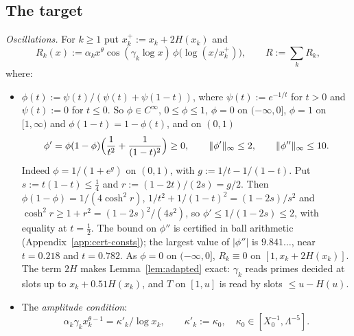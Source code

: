 \subsection{The target}\label{sec:target}
\emph{Oscillations.} For $k\ge1$ put $x_k^+:=x_k+2H(x_k)$ and
\begin{equation}\label{eq:Rk}
  R_k(x):=\alpha_kx^{\theta}\cos(\gamma_k\log x)\,\phi\bigl(\log(x/x_k^+)\bigr),\qquad R:=\sum_kR_k,
\end{equation}
where:
\begin{itemize}
\item $\phi(t):=\psi(t)/(\psi(t)+\psi(1-t))$, where $\psi(t):=e^{-1/t}$ for $t>0$ and $\psi(t):=0$ for $t\le0$. So $\phi\in C^\infty$,
$0\le\phi\le1$, $\phi=0$ on $(-\infty,0]$, $\phi=1$ on $[1,\infty)$ and $\phi(1-t)=1-\phi(t)$, and on $(0,1)$
\begin{equation}\label{eq:phibounds}
  \phi'=\phi(1-\phi)\Bigl(\frac1{t^2}+\frac1{(1-t)^2}\Bigr)\ge0,\qquad\|\phi'\|_\infty\le2,\qquad\|\phi''\|_\infty\le10 .
\end{equation}
Indeed $\phi=1/(1+e^g)$ on $(0,1)$, with $g:=1/t-1/(1-t)$. Put $s:=t(1-t)\le\frac14$ and $r:=(1-2t)/(2s)=g/2$. Then
$\phi(1-\phi)=1/(4\cosh^2r)$, $1/t^2+1/(1-t)^2=(1-2s)/s^2$ and $\cosh^2r\ge1+r^2=(1-2s)^2/(4s^2)$, so $\phi'\le1/(1-2s)\le2$, with
equality at $t=\frac12$. The bound on $\phi''$ is certified in ball arithmetic (Appendix~\ref{app:cert-consts}); the largest value of
$|\phi''|$ is $9.841\ldots$, near $t=0.218$ and $t=0.782$. As $\phi=0$ on $(-\infty,0]$, $R_k\equiv0$ on
$[1,x_k+2H(x_k)]$. The term $2H$ makes Lemma~\ref{lem:adapted} exact: $\gamma_k$ reads primes decided at slots up to
$x_k+0.51H(x_k)$, and $T$ on $[1,u]$ is read by slots $\le u-H(u)$.
\item The \emph{amplitude condition}:
\begin{equation}\label{eq:ampl}
  \alpha_k\gamma_kx_k^{\theta-1}=\kappa'_k/\log x_k,\qquad \kappa'_k:=\kappa_0,\quad \kappa_0\in[X_0^{-1},\Lambda^{-5}].
\end{equation}

\end{itemize}
